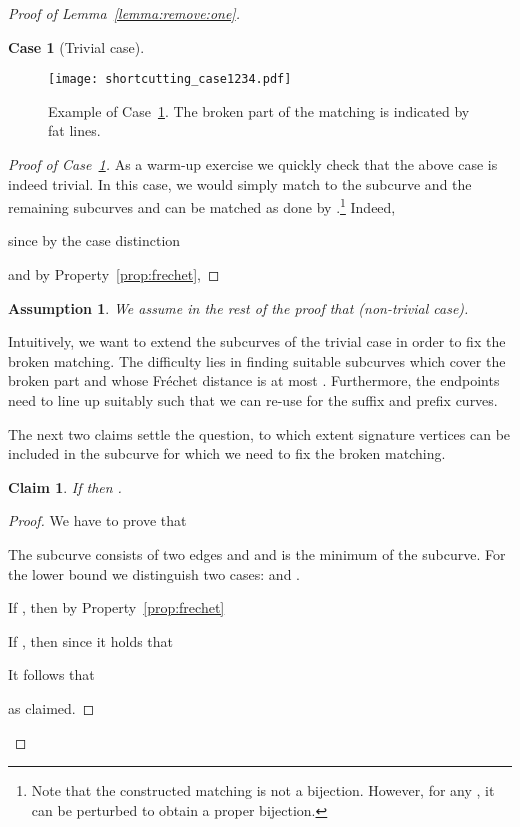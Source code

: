 \documentclass[11pt, letter]{article}
\newtheorem{claim}[theorem]{Claim}
\newtheorem{case}[]{Case}
\newtheorem{assumption}[]{Assumption}
\newcommand{\lemref}[1]{Lemma~\ref{lemma:#1}}
\newcommand{\figlab}[1]{\label{fig:#1}}
\newcommand{\caselab}[1]{\label{case:#1}}
\newcommand{\caseref}[1]{Case~\ref{case:#1}}
\newcommand{\claimlab}[1]{\label{claim:#1}}
\newcommand{\asslab}[1]{\label{ass:#1}}
\newcommand{\propref}[1]{Property~\ref{prop:#1}}
\newcommand{\Frechet}{Fr\'echet\xspace}
\begin{document}
\begin{proof}[Proof of \lemref{remove:one}]
\begin{case}[Trivial case]
\caselab{trivial}
\end{case}
\begin{figure}[h]\centering
\texttt{[image: shortcutting\_case1234.pdf]}\\
\caption{Example of \caseref{trivial}. The broken part of the matching  is indicated by fat lines.}
\figlab{shortcutting:case1}
\end{figure}
\begin{proof}[Proof of \caseref{trivial}]
As a warm-up exercise we quickly check that the above case is indeed trivial. In
this case, we would simply match  to the subcurve
 and the remaining subcurves  and
 can be matched as done by .\footnote{Note that the constructed
matching is not a bijection. However, for any , it can be perturbed to obtain a 
proper bijection.} Indeed, 

since by the case distinction 

and by \propref{frechet}, 

\end{proof}

\begin{assumption}
We assume in the rest of the proof that  (non-trivial case).
\asslab{nontrivialcase}
\end{assumption}

Intuitively, we want to extend the subcurves of the
trivial case in order to fix the broken matching. The difficulty lies in finding
suitable subcurves which cover the broken part  and
whose \Frechet distance is at most . Furthermore, the endpoints need to
line up suitably such that we can re-use  for the suffix and prefix curves.

The next two claims settle the question, to which extent signature vertices can be
included in the subcurve  for which we need to fix the broken matching. 

\begin{claim}
If  then
.
\claimlab{descent:after:sj1}
\end{claim}
\begin{proof}
We have to prove that


The subcurve  consists of two edges  and   and  is the minimum of the subcurve. For the lower bound we distinguish two cases:  and . 

If , then by \propref{frechet}


If , then since  it holds that

It follows that 
 
as claimed.




\end{proof}
\end{proof}
\end{document}
